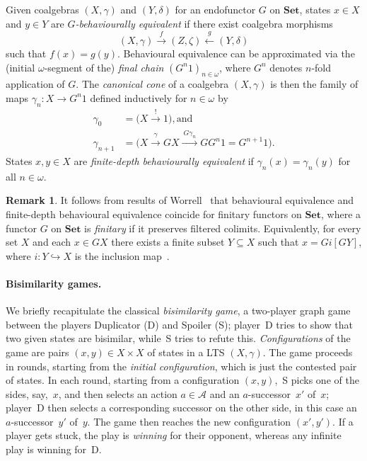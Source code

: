 \documentclass[sigconf,
			final%
			nonacm
                        ]{acmart}
\numberwithin{equation}{section}
\numberwithin{equation}{section}
\theoremstyle{plain}
\theoremstyle{definition}
\newtheorem{rem}[thm]{Remark}
\newcommand{\subto}{\hookrightarrow}
\newcommand{\xra}[1]{\xrightarrow{~#1~}}
\newcommand{\xla}[1]{\xleftarrow{~#1~}}
\newcommand{\Set}{\mathbf{Set}}
\newcommand{\A}{\mathcal{A}}            %
\begin{document}
Given coalgebras $(X, \gamma)$ and $(Y, \delta)$ for an endofunctor
$G$ on $\Set$, states $x\in X$ and $y\in Y$ are
\emph{$G$-behaviourally equivalent} if there exist coalgebra morphisms
\[
  (X,\gamma) \xra{f} (Z,\zeta) \xla{g} (Y,\delta)
\]
such that $f(x)= g(y)$. Behavioural equivalence can be approximated
via the (initial $\omega$-segment of the) \emph{final chain}
$(G^n1)_{n\in\omega}$, where $G^n$ denotes $n$-fold application of
$G$. %
The \emph{canonical cone} of a coalgebra
$(X, \gamma)$ is then the family of maps $\gamma_n\colon X\to G^n1$
defined inductively for $n\in\omega$ by
\begin{align*}
  \gamma_0 &= \big(X\xra{!} 1\big), \text{and} \\
  \gamma_{n+1} &= \big(X \xra{\gamma} GX \xra{G\gamma_n} GG^n 1 = G^{n+1}1\big).
\end{align*}
States $x, y\in X$ are \emph{finite-depth behaviourally equivalent} if
$\gamma_n(x)= \gamma_n(y)$ for all $n \in \omega$.

\begin{rem}\label{rem:finite-depth}
  It follows from results of Worrell~\cite{Worrell05} that behavioural
  equivalence and finite-depth behavioural equivalence coincide for
  finitary functors on $\Set$, where a functor $G$ on $\Set$ is
  \emph{finitary} if it preserves filtered colimits. Equivalently, for
  every set $X$ and each $x \in GX$ there exists a finite subset $Y
  \subseteq X$ such that $x = Gi[GY]$, where $i\colon Y \subto X$ is
  the inclusion map~\cite[Cor.~3.3]{amsw19-1}.
\end{rem}

\paragraph*{Bisimilarity games.}
We briefly recapitulate the classical \emph{bisimilarity game}, a
two-player graph game between the players Duplicator (D) and Spoiler
(S); player~D tries to show that two given states are bisimilar,
while~S tries to refute this. \emph{Configurations} of the game are
pairs $(x, y)\in X\times X$ of states in a LTS $(X, \gamma)$. The game
proceeds in rounds, starting from the \emph{initial configuration},
which is just the contested pair of states. In each round, starting
from a configuration $(x, y)$,~S picks one of the sides, say,~$x$, and
then selects an action $a\in\A$ and an $a$-successor~$x'$ of~$x$;
player~D then selects a corresponding successor on the other side, in
this case an $a$-successor~$y'$ of~$y$. The game then reaches the new
configuration $(x', y')$. If a player gets stuck, the play is
\emph{winning} for their opponent, whereas any infinite play is
winning for~D.
\end{document}
